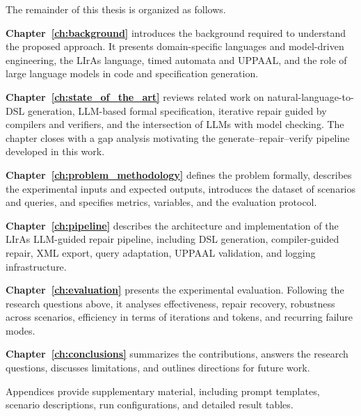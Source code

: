 The remainder of this thesis is organized as follows.

\textbf{Chapter~\ref{ch:background}} introduces the background required to understand the proposed approach.
It presents domain-specific languages and model-driven engineering, the LIrAs language, timed automata and UPPAAL, and the role of large language models in code and specification generation.

\textbf{Chapter~\ref{ch:state_of_the_art}} reviews related work on natural-language-to-DSL generation, LLM-based formal specification, iterative repair guided by compilers and verifiers, and the intersection of LLMs with model checking.
The chapter closes with a gap analysis motivating the generate--repair--verify pipeline developed in this work.

\textbf{Chapter~\ref{ch:problem_methodology}} defines the problem formally, describes the experimental inputs and expected outputs, introduces the dataset of scenarios and queries, and specifies metrics, variables, and the evaluation protocol.

\textbf{Chapter~\ref{ch:pipeline}} describes the architecture and implementation of the LIrAs LLM-guided repair pipeline, including DSL generation, compiler-guided repair, XML export, query adaptation, UPPAAL validation, and logging infrastructure.

\textbf{Chapter~\ref{ch:evaluation}} presents the experimental evaluation.
Following the research questions above, it analyses effectiveness, repair recovery, robustness across scenarios, efficiency in terms of iterations and tokens, and recurring failure modes.

\textbf{Chapter~\ref{ch:conclusions}} summarizes the contributions, answers the research questions, discusses limitations, and outlines directions for future work.

Appendices provide supplementary material, including prompt templates, scenario descriptions, run configurations, and detailed result tables.
